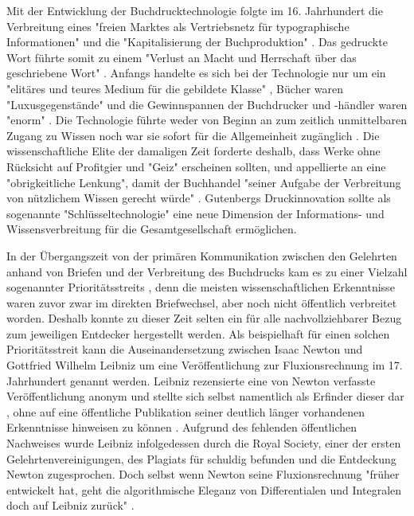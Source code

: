 Mit der Entwicklung der Buchdrucktechnologie folgte im 16. Jahrhundert die Verbreitung eines "freien Marktes als Vertriebsnetz für typographische Informationen"\cite{Giesecke_1991} und die "Kapitalisierung der Buchproduktion" \cite{Steiner_1998}. Das gedruckte Wort führte somit zu einem "Verlust an Macht und Herrschaft über das geschriebene Wort" \cite{Wunderlich_2008}. Anfangs handelte es sich bei der Technologie nur um ein "elitäres und teures Medium für die gebildete Klasse" \cite{Hartmann_2008}, Bücher waren "Luxusgegenstände" und die Gewinnspannen der Buchdrucker und -händler waren "enorm" \cite{Stober_2014}. Die Technologie führte weder von Beginn an zum zeitlich unmittelbaren Zugang zu Wissen noch war sie sofort für die Allgemeinheit zugänglich \cite{Hartmann_2008}. Die wissenschaftliche Elite der damaligen Zeit forderte deshalb, dass Werke ohne Rücksicht auf Profitgier und "Geiz" \cite{Luther_1876} erscheinen sollten, und appellierte an eine "obrigkeitliche Lenkung", damit der Buchhandel "seiner Aufgabe der Verbreitung von nützlichem Wissen gerecht würde" \cite{Wittmann_1999}. Gutenbergs Druckinnovation sollte als sogenannte "Schlüsseltechnologie" \cite{Jaeger_1993} eine neue Dimension der Informations- und Wissensverbreitung für die Gesamtgesellschaft ermöglichen.

In der Übergangszeit von der primären Kommunikation zwischen den Gelehrten anhand von Briefen und der Verbreitung des Buchdrucks kam es zu einer Vielzahl sogenannter Prioritätsstreits \cite{Schirmbacher_2009}, denn die meisten wissenschaftlichen Erkenntnisse waren zuvor zwar im direkten Briefwechsel, aber noch nicht öffentlich verbreitet worden. Deshalb konnte zu dieser Zeit selten ein für alle nachvollziehbarer Bezug zum jeweiligen Entdecker hergestellt werden. Als beispielhaft für einen solchen Prioritätsstreit kann die Auseinandersetzung zwischen Isaac Newton und Gottfried Wilhelm Leibniz um eine Veröffentlichung zur Fluxionsrechnung im 17. Jahrhundert genannt werden. Leibniz rezensierte eine von Newton verfasste Veröffentlichung anonym und stellte sich selbst namentlich als Erfinder dieser dar \cite{Leibniz_2013}, ohne auf eine öffentliche Publikation seiner deutlich länger vorhandenen Erkenntnisse hinweisen zu können \cite{Schirmbacher_2009}. Aufgrund des fehlenden öffentlichen Nachweises wurde Leibniz infolgedessen durch die Royal Society, einer der ersten Gelehrtenvereinigungen, des Plagiats für schuldig befunden und die Entdeckung Newton zugesprochen. Doch selbst wenn Newton seine Fluxionsrechnung "früher entwickelt hat, geht die algorithmische Eleganz von Differentialen und Integralen doch auf Leibniz zurück" \cite{Kittler_1996}.

